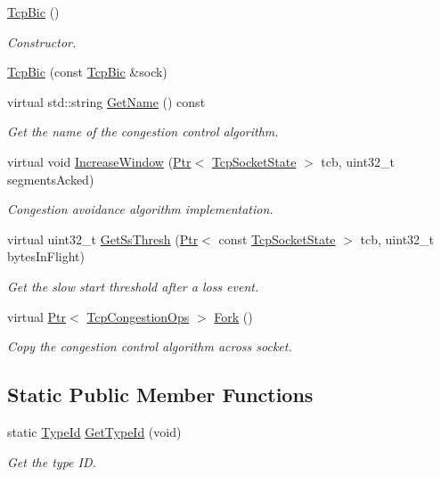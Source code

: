 \begin{DoxyCompactItemize}
\item 
\hyperlink{classns3_1_1TcpBic_a9d92f8d0eefa602b7c1ce57a6d23e644}{Tcp\+Bic} ()
\begin{DoxyCompactList}\small\item\em Constructor. \end{DoxyCompactList}\item 
\hyperlink{classns3_1_1TcpBic_a1a4dc7ff3e9a205cd8735483e7140b85}{Tcp\+Bic} (const \hyperlink{classns3_1_1TcpBic}{Tcp\+Bic} \&sock)
\item 
virtual std\+::string \hyperlink{classns3_1_1TcpBic_a9bcd165ebad9933aea1e63ea3c5fe954}{Get\+Name} () const 
\begin{DoxyCompactList}\small\item\em Get the name of the congestion control algorithm. \end{DoxyCompactList}\item 
virtual void \hyperlink{classns3_1_1TcpBic_a9dbe81be07cbfc1cd16af03deb9ccc34}{Increase\+Window} (\hyperlink{classns3_1_1Ptr}{Ptr}$<$ \hyperlink{classns3_1_1TcpSocketState}{Tcp\+Socket\+State} $>$ tcb, uint32\+\_\+t segments\+Acked)
\begin{DoxyCompactList}\small\item\em Congestion avoidance algorithm implementation. \end{DoxyCompactList}\item 
virtual uint32\+\_\+t \hyperlink{classns3_1_1TcpBic_aaec211ef4f1624860911aaf544ac9650}{Get\+Ss\+Thresh} (\hyperlink{classns3_1_1Ptr}{Ptr}$<$ const \hyperlink{classns3_1_1TcpSocketState}{Tcp\+Socket\+State} $>$ tcb, uint32\+\_\+t bytes\+In\+Flight)
\begin{DoxyCompactList}\small\item\em Get the slow start threshold after a loss event. \end{DoxyCompactList}\item 
virtual \hyperlink{classns3_1_1Ptr}{Ptr}$<$ \hyperlink{classns3_1_1TcpCongestionOps}{Tcp\+Congestion\+Ops} $>$ \hyperlink{classns3_1_1TcpBic_aeeae424187b16d5377f88f1efe104c3e}{Fork} ()
\begin{DoxyCompactList}\small\item\em Copy the congestion control algorithm across socket. \end{DoxyCompactList}\end{DoxyCompactItemize}
\subsection*{Static Public Member Functions}
\begin{DoxyCompactItemize}
\item 
static \hyperlink{classns3_1_1TypeId}{Type\+Id} \hyperlink{classns3_1_1TcpBic_af4bcf98492aae31b8cb000b50b4614e5}{Get\+Type\+Id} (void)
\begin{DoxyCompactList}\small\item\em Get the type ID. \end{DoxyCompactList}\end{DoxyCompactItemize}

